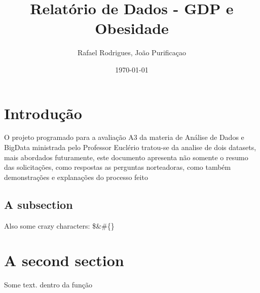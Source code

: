 \documentclass{article}%
\title{Relatório de Dados {-} GDP e Obesidade}%
\author{Rafael Rodrigues, João Purificaçao}%
\date{\today}%
\begin{document}
%
\normalsize%
\maketitle%
\section{Introdução}%
\label{sec:Introduo}%
\newline%
    O projeto programado para a avaliação A3 da materia de Análise de Dados e BigData ministrada pelo Professor Euclério tratou{-}se da analise de dois datasets, mais abordados futuramente, este documento apresenta não somente o resumo das solicitações, como respostas as perguntas norteadoras, como também demonstrações e explanações do processo feito\newline%
\subsection{A subsection}%
\label{subsec:Asubsection}%
Also some crazy characters: \$\&\#\{\}

%
\section{A second section}%
\label{sec:Asecondsection}%
Some text. dentro da função

%
\end{document}
